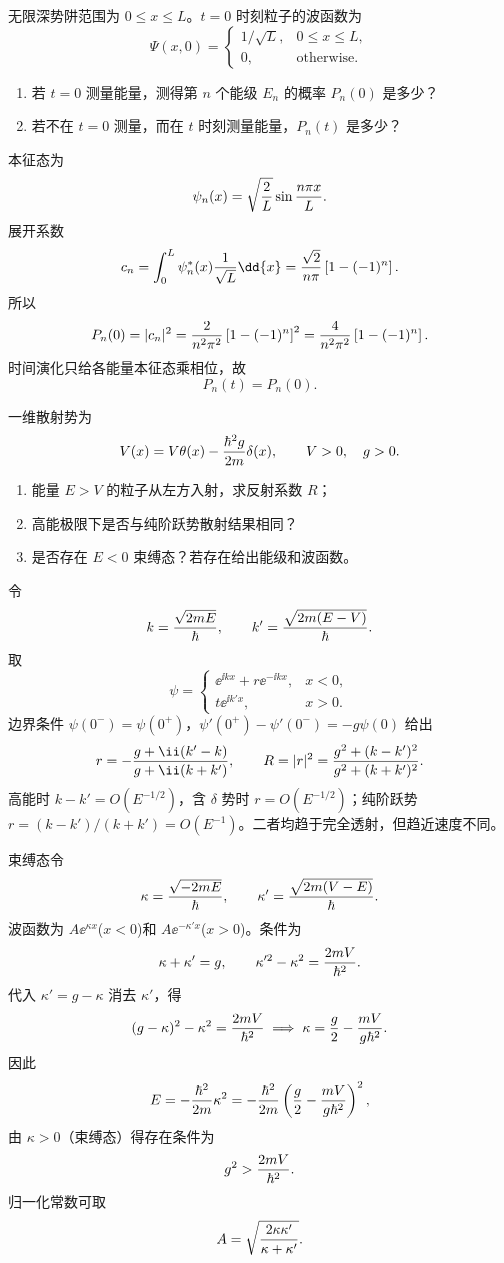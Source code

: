 \begin{question}
无限深势阱范围为 $0\le x\le L$。$t=0$ 时刻粒子的波函数为
\[
\Psi(x,0)=\begin{cases}1/\sqrt L,&0\le x\le L,\\0,&\text{otherwise}.
\end{cases}
\]
\begin{enumerate}
  \item 若 $t=0$ 测量能量，测得第 $n$ 个能级 $E_n$ 的概率 $P_n(0)$ 是多少？
  \item 若不在 $t=0$ 测量，而在 $t$ 时刻测量能量，$P_n(t)$ 是多少？
\end{enumerate}
\begin{solution}
本征态为
\[
  \psi_n(x)=\sqrt{2\over L}\sin {n\pi x\over L}.
\]
展开系数
\[
  c_n=\int_0^L\psi_n^*(x){1\over\sqrt L}\dd{x}
  ={\sqrt2\over n\pi}\left[1-(-1)^n\right].
\]
所以
\[
  P_n(0)=|c_n|^2={2\over n^2\pi^2}\left[1-(-1)^n\right]^2
  ={4\over n^2\pi^2}\left[1-(-1)^n\right].
\]
时间演化只给各能量本征态乘相位，故
\[
  P_n(t)=P_n(0).
\]
\end{solution}
\end{question}

\begin{question}
一维散射势为
\[
  V(x)=V\theta(x)-{\hbar^2g\over2m}\delta(x),\qquad V>0,
  \quad g>0.
\]
\begin{enumerate}
  \item 能量 $E>V$ 的粒子从左方入射，求反射系数 $R$；
  \item 高能极限下是否与纯阶跃势散射结果相同？
  \item 是否存在 $E<0$ 束缚态？若存在给出能级和波函数。
\end{enumerate}
\begin{solution}
令
\[
  k={\sqrt{2mE}\over\hbar},\qquad k'={\sqrt{2m(E-V)}\over\hbar}.
\]
取
\[
\psi=\begin{cases}\ee^{\ii kx}+r\ee^{-\ii kx},&x<0,\\ t\ee^{\ii k'x},&x>0.
\end{cases}
\]
边界条件 $\psi(0^-)=\psi(0^+)$，$\psi'(0^+)-\psi'(0^-)=-g\psi(0)$ 给出
\[
  r=-{g+\ii(k'-k)\over g+\ii(k+k')},
  \qquad
  R=|r|^2={g^2+(k-k')^2\over g^2+(k+k')^2}.
\]
高能时 $k-k'=O(E^{-1/2})$，含 $\delta$ 势时 $r=O(E^{-1/2})$；纯阶跃势 $r=(k-k')/(k+k')=O(E^{-1})$。二者均趋于完全透射，但趋近速度不同。

束缚态令
\[
  \kappa={\sqrt{-2mE}\over\hbar},
  \qquad \kappa'={\sqrt{2m(V-E)}\over\hbar}.
\]
波函数为 $A\ee^{\kappa x}$($x<0$)和 $A\ee^{-\kappa'x}$($x>0$)。条件为
\[
  \kappa+\kappa'=g,\qquad
  \kappa'^2-\kappa^2={2mV\over\hbar^2}.
\]
代入 $\kappa'=g-\kappa$ 消去 $\kappa'$，得
\[
  (g-\kappa)^2-\kappa^2={2mV\over\hbar^2}
  \;\Longrightarrow\;
  \kappa={g\over2}-{mV\over g\hbar^2}.
\]
因此
\[
  E=-{\hbar^2\over2m}\kappa^2
  =-{\hbar^2\over2m}\left({g\over2}-{mV\over g\hbar^2}\right)^2,
\]
由 $\kappa>0$（束缚态）得存在条件为
\[
  g^2>{2mV\over\hbar^2}.
\]
归一化常数可取
\[
  A=\sqrt{2\kappa\kappa'\over\kappa+\kappa'}.
\]
\end{solution}
\end{question}

